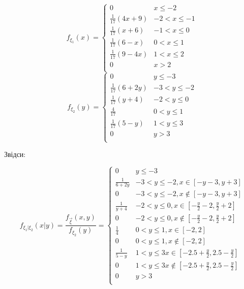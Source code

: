 \documentclass{article}
\begin{document}
		$$f_{\xi_1}(x) = 
	\begin{cases}
		0 & x \leq -2 \\
		  \frac{1}{17} (4x+9) & -2 < x \leq -1 \\
		  \frac{1}{17} (x + 6) & -1 < x \leq 0 \\
		  \frac{1}{17} (6-x) & 0 < x \leq 1 \\
		  \frac{1}{17} (9-4x) & 1 < x \leq 2 \\
		0 & x > 2 \\
	\end{cases}$$
	$$f_{\xi_2}(y) = 
	\begin{cases}
		0 & y \leq -3 \\
		\frac{1}{17}(6+2y) & -3 < y \leq -2 \\
		\frac{1}{17}(y+4) & -2 < y \leq 0 \\
		\frac{4}{17} & 0 < y \leq 1 \\
		\frac{1}{17}(5-y) & 1 < y \leq 3 \\
		0 & y > 3 \\
	\end{cases}
	$$
	
	Звідси:
	
	\[
		f_{\xi_1\vert \xi_2}(x\vert y) = \frac{f_{\overrightarrow{\xi}}(x, y)}{f_{\xi_2}(y)} = 
		\begin{cases}
			0 & y \leq -3 \\
			\frac{1}{6+2y} & -3 < y \leq -2, x \in \left[ -y-3, y+3 \right] \\
			0 & -3 < y \leq -2, x \notin \left[ -y-3, y+3 \right] \\
			\frac{1}{y+4} & -2 < y \leq 0, x \in [-\frac{y}{2}-2, \frac{y}{2} + 2] \\
			0 & -2 < y \leq 0, x \notin [-\frac{y}{2}-2, \frac{y}{2} + 2] \\
			\frac{1}{4} & 0 < y \leq 1, x \in [-2, 2] \\
			0 & 0 < y \leq 1, x \notin [-2, 2] \\
			\frac{1}{5-y} & 1 < y \leq 3 x \in [-2.5 + \frac{y}{2}, 2.5 - \frac{y}{2}] \\
			0 & 1 < y \leq 3 x \notin [-2.5 + \frac{y}{2}, 2.5 - \frac{y}{2}]\\
			0 & y > 3\\
		\end{cases}
	\]
	
\end{document}
